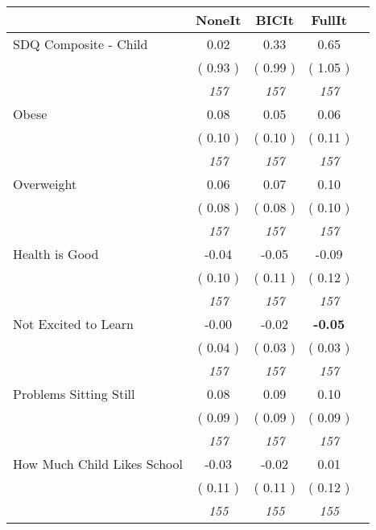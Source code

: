 \begin{tabular}{l c c c c}
\toprule
 & NoneIt & BICIt & FullIt \\
\midrule
SDQ Composite - Child &      0.02 &      0.33 &      0.65 \\
& (     0.93 ) & (     0.99 ) & (     1.05 ) \\
& \textit{ 157 } & \textit{ 157 } & \textit{ 157 } \\
Obese &      0.08 &      0.05 &      0.06 \\
& (     0.10 ) & (     0.10 ) & (     0.11 ) \\
& \textit{ 157 } & \textit{ 157 } & \textit{ 157 } \\
Overweight &      0.06 &      0.07 &      0.10 \\
& (     0.08 ) & (     0.08 ) & (     0.10 ) \\
& \textit{ 157 } & \textit{ 157 } & \textit{ 157 } \\
Health is Good &     -0.04 &     -0.05 &     -0.09 \\
& (     0.10 ) & (     0.11 ) & (     0.12 ) \\
& \textit{ 157 } & \textit{ 157 } & \textit{ 157 } \\
Not Excited to Learn &     -0.00 &     -0.02 & \textbf{     -0.05 } \\
& (     0.04 ) & (     0.03 ) & (     0.03 ) \\
& \textit{ 157 } & \textit{ 157 } & \textit{ 157 } \\
Problems Sitting Still &      0.08 &      0.09 &      0.10 \\
& (     0.09 ) & (     0.09 ) & (     0.09 ) \\
& \textit{ 157 } & \textit{ 157 } & \textit{ 157 } \\
How Much Child Likes School &     -0.03 &     -0.02 &      0.01 \\
& (     0.11 ) & (     0.11 ) & (     0.12 ) \\
& \textit{ 155 } & \textit{ 155 } & \textit{ 155 } \\
\bottomrule
\end{tabular}
